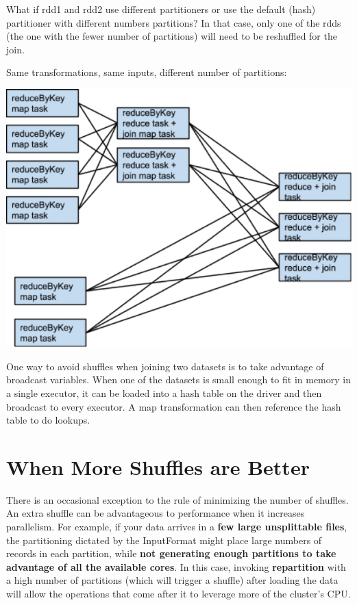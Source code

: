 What if rdd1 and rdd2 use different partitioners or use the default (hash) partitioner with different numbers 
partitions?  In that case, only one of the rdds (the one with the fewer number of partitions) will need to be 
reshuffled for the join.

Same transformations, same inputs, different number of partitions:

\includegraphics{../../img/spark/spark-tuning-f5.png}

One way to avoid shuffles when joining two datasets is to take advantage of broadcast variables. When one of the 
datasets is small enough to fit in memory in a single executor, it can be loaded into a hash table on the driver and 
then broadcast to every executor. A map transformation can then reference the hash table to do lookups.

\section{When More Shuffles are Better}

There is an occasional exception to the rule of minimizing the number of shuffles. An extra shuffle can be advantageous 
to performance when it increases parallelism. For example, if your data arrives in a \textbf{few large unsplittable files}, 
the partitioning dictated by the InputFormat might place large numbers of records in each partition, while \textbf{not 
generating enough partitions to take advantage of all the available cores}. In this case, invoking \textbf{repartition}
with a high number of partitions (which will trigger a shuffle) after loading the data will allow the operations that come 
after it to leverage more of the cluster’s CPU.

